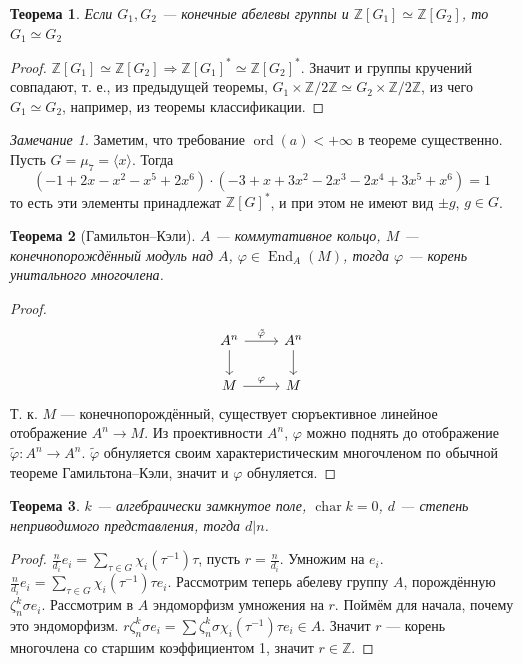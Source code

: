 \documentclass{article}
\newtheorem*{theorem}{Теорема}
\theoremstyle{definition}
\theoremstyle{remark}
\newtheorem*{remark}{Замечание}
\DeclareMathOperator{\chr}{char}
\DeclareMathOperator{\End}{End}
\DeclareMathOperator{\ord}{ord}
\newcommand{\Ra}{\Rightarrow}
\newcommand{\Z}{\mathbb{Z}}
\begin{document}
\begin{theorem}
Если $G_1, G_2$ --- конечные абелевы группы и $\Z[G_1] \simeq \Z[G_2]$, то $G_1 \simeq G_2$
\end{theorem}
\begin{proof}
    $\Z[G_1] \simeq \Z[G_2] \Ra \Z[G_1]^* \simeq \Z[G_2]^*$. Значит и группы кручений совпадают, т. е., из предыдущей теоремы, $G_1 \times \Z / 2\Z \simeq G_2 \times \Z / 2\Z$, из чего $G_1 \simeq G_2$, например, из теоремы классификации.
\end{proof}

\begin{remark}
    Заметим, что требование $\ord(a) < +\infty$ в теореме существенно. Пусть $G = \mu_7 = \langle x \rangle$. Тогда
    \begin{equation*}
        (-1 + 2x - x^2 - x^5 + 2x^6) \cdot (-3 + x + 3x^2 - 2x^3 - 2x^4 + 3x^5 + x^6) = 1
    \end{equation*}
    то есть эти элементы принадлежат $\Z[G]^*$, и при этом не имеют вид $\pm g$, $g \in G$.
\end{remark}

\begin{theorem}[Гамильтон--Кэли]
$A$ --- коммутативное кольцо, $M$ --- конечнопорождённый модуль над $A$, $\varphi \in \End_A(M)$, тогда $\varphi$ --- корень унитального многочлена.
\end{theorem}
\begin{proof}
\begin{equation*}
    \begin{tikzcd}
A^n \rar{\tilde{\varphi}} \dar & A^n \dar \\
M \rar{\varphi} & M
\end{tikzcd}
\end{equation*}
Т. к. $M$ --- конечнопорождённый, существует сюръективное линейное отображение $A^n \rightarrow M$. Из проективности $A^n$, $\varphi$ можно поднять до отображение $\tilde{\varphi}: A^n \rightarrow A^n$. $\tilde{\varphi}$ обнуляется своим характеристическим многочленом по обычной теореме Гамильтона--Кэли, значит и $\varphi$ обнуляется.
\end{proof}
\begin{theorem}
$k$ --- алгебраически замкнутое поле, $\chr k = 0$, $d$ --- степень неприводимого представления, тогда $d | n$.
\end{theorem}
\begin{proof}
	$\frac{n}{d_i}e_i = \sum\limits_{\tau \in G} \chi_i(\tau^{-1})\tau$, пусть $r = \frac{n}{d_i}$. Умножим на $e_i$. $\frac{n}{d_i}e_i = \sum\limits_{\tau \in G} \chi_i(\tau^{-1})\tau e_i$. Рассмотрим теперь абелеву группу $A$, порождённую $\zeta_n^k \sigma e_i$. Рассмотрим в $A$ эндоморфизм умножения на $r$. Поймём для начала, почему это эндоморфизм. $r\zeta_n^k \sigma e_i = \sum \zeta_n^k \sigma \chi_i(\tau^{-1})\tau e_i \in A$. Значит $r$ --- корень многочлена со старшим коэффициентом 1, значит $r \in \Z$.
\end{proof}
\end{document}
